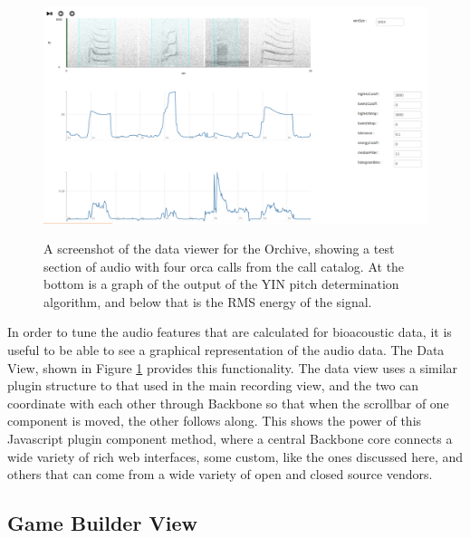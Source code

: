 \documentclass[12pt,oneside]{book}
\begin{document}
\begin{figure}[t]
\centering
\includegraphics[width=\columnwidth]{figures/orchiveV2dataView}
\label{fig:orchiveV2dataView}
\caption{A screenshot of the data viewer for the Orchive, showing a
  test section of audio with four orca calls from the call catalog.
  At the bottom is a graph of the output of the YIN pitch
  determination algorithm, and below that is the RMS energy of the
  signal.}
\end{figure}

In order to tune the audio features that are calculated for
bioacoustic data, it is useful to be able to see a graphical
representation of the audio data.  The Data View, shown in Figure
\ref{fig:orchiveV2dataView} provides this functionality.  The data
view uses a similar plugin structure to that used in the main
recording view, and the two can coordinate with each other through
Backbone so that when the scrollbar of one component is moved, the
other follows along.  This shows the power of this Javascript plugin
component method, where a central Backbone core connects a wide
variety of rich web interfaces, some custom, like the ones discussed
here, and others that can come from a wide variety of open and closed
source vendors.


\subsection{Game Builder View}
\end{document}
